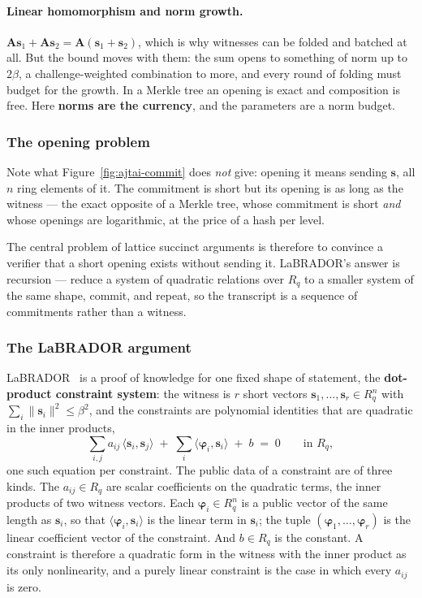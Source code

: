 \paragraph{Linear homomorphism and norm growth.}
$\mathbf{A}\mathbf{s}_1+\mathbf{A}\mathbf{s}_2=\mathbf{A}(\mathbf{s}_1+\mathbf{s}_2)$,
which is why witnesses can be folded and batched at all. But the bound moves
with them: the sum opens to something of norm up to $2\beta$, a challenge-weighted
combination to more, and every round of folding must budget for the growth. In a
Merkle tree an opening is exact and composition is free. Here \textbf{norms are
the currency}, and the parameters are a norm budget.

\subsubsection{The opening problem}
Note what Figure~\ref{fig:ajtai-commit} does \emph{not} give: opening it means
sending $\mathbf{s}$, all $n$ ring elements of it. The commitment is short but
its opening is as long as the witness --- the exact opposite of a Merkle tree,
whose commitment is short \emph{and} whose openings are logarithmic, at the price
of a hash per level.

The central problem of lattice succinct arguments is therefore to convince a
verifier that a short opening exists without sending it. LaBRADOR's answer is
recursion --- reduce a system of quadratic relations
over $R_q$ to a smaller system of the same shape, commit, and repeat, so the
transcript is a sequence of commitments rather than a witness.

\subsubsection{The LaBRADOR argument}
\label{sec:labrador-outline}
LaBRADOR~\cite{labrador2023} is a proof of knowledge for one fixed shape of
statement, the \textbf{dot-product constraint system}: the witness is $r$ short
vectors $\mathbf{s}_1,\dots,\mathbf{s}_r\in R_q^{n}$ with
$\sum_i\|\mathbf{s}_i\|^2\le\beta^2$, and the constraints are polynomial
identities that are quadratic in the inner products,
\[
  \sum_{i,j} a_{ij}\,\langle \mathbf{s}_i,\mathbf{s}_j\rangle
  \;+\;\sum_i \langle \boldsymbol{\varphi}_i,\mathbf{s}_i\rangle
  \;+\; b \;=\; 0 \qquad\text{in } R_q ,
\]
one such equation per constraint. The public data of a constraint are of
three kinds. The $a_{ij}\in R_q$ are scalar coefficients on the quadratic
terms, the inner products of two witness vectors. Each
$\boldsymbol{\varphi}_i\in R_q^{n}$ is a public vector of the same length as
$\mathbf{s}_i$, so that $\langle\boldsymbol{\varphi}_i,\mathbf{s}_i\rangle$ is
the linear term in $\mathbf{s}_i$; the tuple
$(\boldsymbol{\varphi}_1,\dots,\boldsymbol{\varphi}_r)$ is the linear
coefficient vector of the constraint. And $b\in R_q$ is the constant. A
constraint is therefore a quadratic form in the witness with the inner product
as its only nonlinearity, and a purely linear constraint is the case in which
every $a_{ij}$ is zero.

